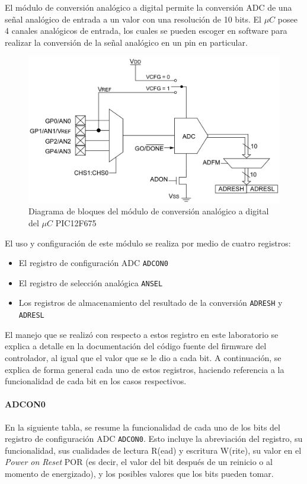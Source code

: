 El módulo de conversión analógico a digital permite la conversión ADC de una señal analógico de entrada a un valor con una resolución de 10 bits. 
El $\mu C$ posee 4 canales analógicos de entrada, los cuales se pueden escoger en software para realizar la conversión de la señal analógico en un pin en particular. 

\begin{figure}[!h]
    \centering
    \includegraphics[width = 0.7\linewidth]{imagenes/fig3.png}
    \caption{Diagrama de bloques del módulo de conversión analógico a digital del $\mu C$ PIC12F675}
    \label{fig3}
\end{figure}

El uso y configuración de este módulo se realiza por medio de cuatro registros: 
\begin{itemize}
    \item El registro de configuración ADC \texttt{ADCON0}
    \item El registro de selección analógica \texttt{ANSEL}
    \item Los registros de almacenamiento del resultado de la conversión \texttt{ADRESH} y \texttt{ADRESL}
\end{itemize}

El manejo que se realizó con respecto a estos registro en este laboratorio se explica a detalle en la documentación del código fuente del firmware del controlador, al igual que el valor que se le dio a cada bit.
A continuación, se explica de forma general cada uno de estos registros, haciendo referencia a la funcionalidad de cada bit en los casos respectivos.

\newpage

\paragraph{ADCON0}

En la siguiente tabla, se resume la funcionalidad de cada uno de los bits del registro de configuración ADC \texttt{ADCON0}. 
Esto incluye la abreviación del registro, su funcionalidad, sus cualidades de lectura R(ead) y escritura W(rite), su valor en el \textit{Power on Reset} POR (es decir, el valor del bit después de un reinicio o al momento de energizado), y los posibles valores que los bits pueden tomar.

